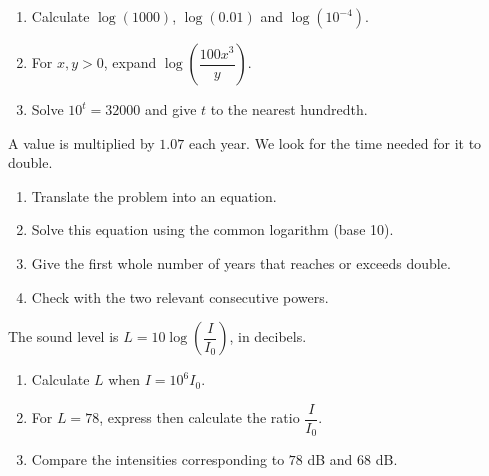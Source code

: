 \begin{exercice}
\begin{enumerate}
\item Calculate $\log(1000)$, $\log(0.01)$ and $\log(10^{-4})$.
\item For $x,y>0$, expand $\log\!\left(\dfrac{100x^3}{y} \right)$.
\item Solve $10^t=32000$ and give $t$ to the nearest hundredth.
\end{enumerate}
\end{exercice}
\begin{exercice}
A value is multiplied by $1.07$ each year. We look for the time needed for it to double.
\begin{enumerate}
\item Translate the problem into an equation.
\item Solve this equation using the common logarithm (base 10).
\item Give the first whole number of years that reaches or exceeds double.
\item Check with the two relevant consecutive powers.
\end{enumerate}
\end{exercice}
\begin{exercice}
The sound level is $L=10\log\!\left(\dfrac I{I_0}\right)$, in decibels.
\begin{enumerate}
\item Calculate $L$ when $I=10^6I_0$.
\item For $L=78$, express then calculate the ratio $\dfrac I{I_0}$.
\item Compare the intensities corresponding to $78$ dB and $68$ dB.
\end{enumerate}
\end{exercice}

